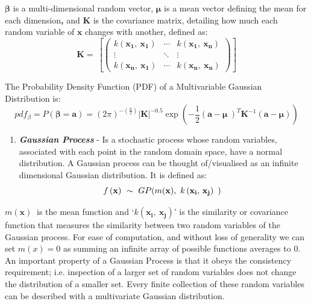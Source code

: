 \documentclass[10.5pt,a4paper,twoside]{report}   %
\begin{document}
${\mathbf \beta }$\textbf{ }is a multi-dimensional random vector, ${\mathbf \mu }$ is a mean vector defining the mean for each dimension\textbf{, }and \textbf{K} is the covariance matrix, detailing how much each random variable of  ${\mathbf x}$ changes with another, defined as:
\[{\mathbf K}=\ \left[\left( \begin{array}{ccc}
k\left({{\mathbf x}}_{{\mathbf 1}},\ {{\mathbf x}}_{{\mathbf 1}}\right) & \cdots  & k\left({{\mathbf x}}_{{\mathbf 1}},\ {{\mathbf x}}_{{\mathbf n}}\right) \\ 
\vdots  & \ddots  & \vdots  \\ 
k\left({{\mathbf x}}_{{\mathbf n}},\ {{\mathbf x}}_{{\mathbf 1}}\right) & \cdots  & k\left({{\mathbf x}}_{{\mathbf n}},\ {{\mathbf x}}_{{\mathbf n}}\right) \end{array}
\right)\right]\] 

 The Probability Density Function (PDF) of a Multivariable Gaussian Distribution is:
\begin{equation}
pdf_{\beta }=P\left({\mathbf \beta }{\mathbf =}{\mathbf a}\right)={\left(2\pi \right)}^{-\left(\frac{n}{2}\right)}{\left|{\mathbf K}\right|}^{-0.5}\exp\left(-\frac{1}{2}{\left({\mathbf a}-{\mathbf \mu }\ \right)}^T{{\mathbf K}}^{-1}({\mathbf a}-{\mathbf \mu })\right)
\end{equation}
\begin{enumerate}
\item  \textbf{\textit{Gaussian Process}} -  Is a stochastic process whose random variables, associated with each point in the random domain space, have a normal distribution. A Gaussian process can be thought of/visualised as an infinite dimensional Gaussian distribution. It is defined as:
\[f\left({\mathbf x}\right)\ \sim \ GP(m({\mathbf x}),\ k\left({{\mathbf x}}_{{\mathbf i}}{\mathbf ,\ }{{\mathbf x}}_{{\mathbf j}}\right){\rm \ })\ \] 
\end{enumerate}
$m({\mathbf x})\ $ is the mean function and `$k\left({{\mathbf x}}_{{\mathbf i}}{\mathbf ,\ }{{\mathbf x}}_{{\mathbf j}}\right)$' is the similarity or covariance function that measures the similarity between two random variables of the Gaussian process. For ease of computation, and without loss of generality we can set $m\left(x\right)=0$ as summing an infinite array of possible functions averages to 0. An important property of a Gaussian Process is that it obeys the consistency requirement; i.e. inspection of a larger set of random variables does not change the distribution of a smaller set. Every finite collection of these random variables can be described with a multivariate Gaussian distribution. 
\end{document}
